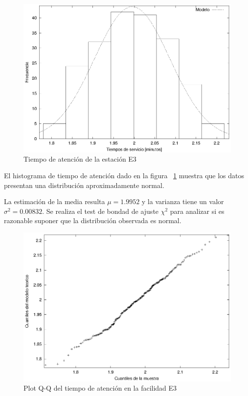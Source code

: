 \documentclass[a4paper,10pt]{article}
\begin{document}
\begin{figure}[hp]
\centering
\includegraphics{graficos/histograma_e3.eps}
\caption{Tiempo de atenci\'on de la estaci\'on E3}
\label{fig:tiempoatencione3}
\end{figure}


El histograma de tiempo de atenci\'on dado en la figura 
 ~\ref{fig:tiempoatencione3}
muestra que los datos presentan una distribuci\'on aproximadamente
normal.

La estimaci\'on de la media resulta $\mu = 1.9952 $ y la varianza tiene un valor
$\sigma^2 = 0.00832$. Se realiza el test de bondad de ajuste $\chi^2$ para
analizar si es razonable suponer que la distribuci\'on observada es normal.

\begin{figure}[hp]
\centering
\includegraphics{graficos/plot_qq_e3.eps}
\caption{Plot Q-Q del tiempo de atenci\'on en la facilidad E3}
\label{fig:qqe3}
\end{figure}
\end{document}
